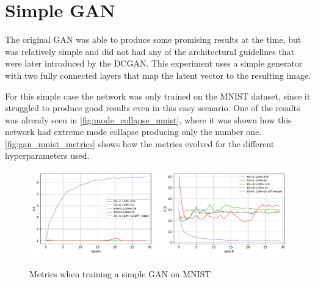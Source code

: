 \section{Simple GAN}
The original \gls{GAN} was able to produce some promising results at the time, but was relatively simple and did not had any of the architectural guidelines that were later introduced by the \gls{DCGAN}. This experiment uses a simple generator with two fully connected layers that map the latent vector to the resulting image. 

For this simple case the network was only trained on the \gls{MNIST} dataset, since it struggled to produce good results even in this easy scenario. One of the results was already seen in \autoref{fig:mode_collapse_mnist}, where it was shown how this network had extreme mode collapse producing only the number one. \autoref{fig:gan_mnist_metrics} shows how the metrics evolved for the different hyperparameters used.
\begin{figure}[hbt]
    \centering
    \caption{Metrics when training a simple GAN on MNIST}
    \includegraphics[width=\textwidth]{chapters/Experiments/GAN/mnist_metrics.pdf}
    \label{fig:gan_mnist_metrics}
\end{figure}


